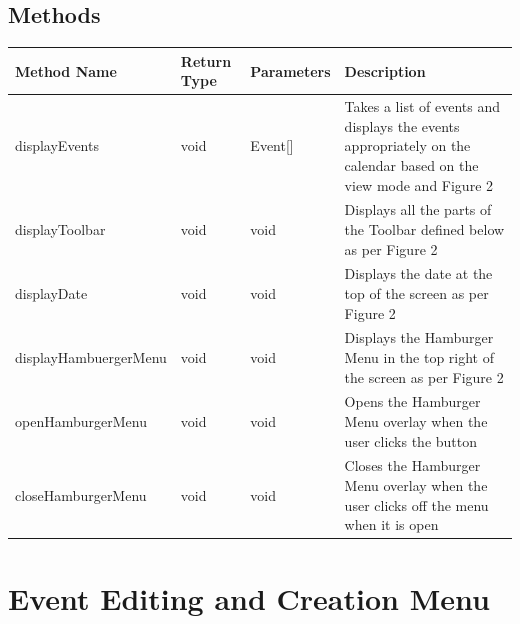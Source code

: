 \documentclass{scrreprt}
\begin{document}
\subsection{Methods}

\begin{center}
\begin{longtable}{ | p{5cm} | p{2cm} | p{3cm} | p{5cm} | }
\hline
\textbf{Method Name} & \textbf{Return Type} & \textbf{Parameters} & \textbf{Description} \\
\hline
displayEvents & void & Event[] & Takes a list of events and displays the events appropriately on the calendar based on the view mode and Figure 2 \\
\hline
displayToolbar & void & void & Displays all the parts of the Toolbar defined below as per Figure 2 \\
\hline
displayDate & void & void & Displays the date at the top of the screen as per Figure 2 \\
\hline
displayHambuergerMenu & void & void & Displays the Hamburger Menu in the top right of the screen as per Figure 2 \\
\hline
openHamburgerMenu & void & void & Opens the Hamburger Menu overlay when the user clicks the button \\
\hline
closeHamburgerMenu & void & void & Closes the Hamburger Menu overlay when the user clicks off the menu when it is open \\
\hline
\end{longtable}
\end{center}

\section{Event Editing and Creation Menu}
\end{document}
